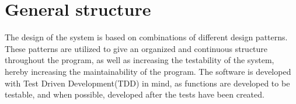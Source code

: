 \section{General structure}
The design of the system is based on combinations of different design patterns. These patterns are utilized to give an organized and continuous structure throughout the program, as well as increasing the testability of the system, hereby increasing the maintainability of the program. 
The software is developed with Test Driven Development(TDD) in mind, as functions are developed to be testable, and when possible, developed after the tests have been created. \\ 
